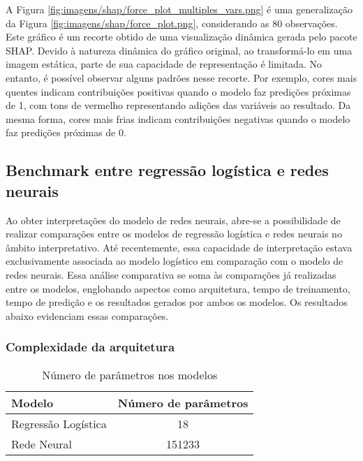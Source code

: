 

A Figura \ref{fig:imagens/shap/force_plot_multiples_vars.png} é uma generalização da Figura \ref{fig:imagens/shap/force_plot.png},
considerando as 80 observações. Este gráfico é um recorte obtido de uma visualização dinâmica gerada pelo pacote SHAP.
 Devido à natureza dinâmica do gráfico original, ao transformá-lo em uma imagem estática, parte de sua capacidade de 
 representação é limitada. No entanto, é possível observar alguns padrões nesse recorte. Por exemplo, cores mais 
 quentes indicam contribuições positivas quando o modelo faz predições próximas de 1, com tons de vermelho 
 representando adições das variáveis ao resultado. Da mesma forma, cores mais frias indicam contribuições 
 negativas quando o modelo faz predições próximas de 0.


\subsection{Benchmark entre regressão logística e redes neurais }

Ao obter interpretações do modelo de redes neurais, abre-se a possibilidade de realizar comparações 
entre os modelos de regressão logística e redes neurais no âmbito interpretativo. Até recentemente, 
essa capacidade de interpretação estava exclusivamente associada ao modelo logístico em comparação com o modelo de redes neurais.
Essa análise comparativa se soma às comparações já realizadas entre os modelos, englobando aspectos como arquitetura,
tempo de treinamento,
tempo de predição e os resultados gerados por ambos os modelos. Os resultados abaixo evidenciam essas comparações.

\subsubsection{Complexidade da arquitetura}

\begin{table}[H]
  \centering
  \begin{tabular}{lc}
  \hline
  \textbf{Modelo} & \textbf{Número de parâmetros} \\ \hline
  Regressão Logística & 18 \\ 
  Rede Neural & 151233 \\ \hline
  \end{tabular}
  \caption{Número de parâmetros nos modelos}
  \label{table:model_parameters}
\end{table}

